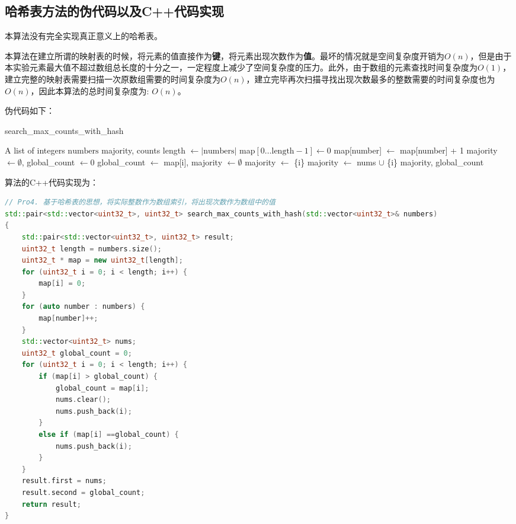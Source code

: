 \documentclass[UTF8,12pt,a4paper]{ctexart}
\begin{document}
\subsection{哈希表方法的伪代码以及C++代码实现}
本算法没有完全实现真正意义上的哈希表。

本算法在建立所谓的映射表的时候，将元素的值直接作为\textbf{键}，将元素出现次数作为\textbf{值}。最坏的情况就是空间复杂度开销为$O(n)$，但是由于本实验元素最大值不超过数组总长度的十分之一，一定程度上减少了空间复杂度的压力。此外，由于数组的元素查找时间复杂度为$O(1)$，建立完整的映射表需要扫描一次原数组需要的时间复杂度为$O(n)$，建立完毕再次扫描寻找出现次数最多的整数需要的时间复杂度也为$O(n)$，因此本算法的总时间复杂度为: $O(n)$。

伪代码如下：
\begin{algorithm}[H]
	\caption{search\_max\_counts\_with\_hash}
	\begin{algorithmic}[1]
	  \Require A list of integers $\text{numbers}$
	  \Ensure majority, counts
	  \State length $\gets |\text{numbers}|$
	  \State map$[0 \dots \text{length}-1] \gets 0$
		\State map[number] $\gets$ map[number] + 1
	  \EndFor
	  \State majority $\gets \emptyset$, global\_count $\gets 0$
		  \State global\_count $\gets$ map[i], majority $\gets \emptyset$
		  \State majority $\gets$ \{i\}
		  \State majority $\gets$ nums $\cup$ \{i\}
		\EndIf
	  \EndFor
	  \State \Return majority, global\_count
	\end{algorithmic}
\end{algorithm}

算法的C++代码实现为：
\begin{lstlisting}[language={C++}, basicstyle=\ttfamily\footnotesize]
// Pro4. 基于哈希表的思想，将实际整数作为数组索引，将出现次数作为数组中的值
std::pair<std::vector<uint32_t>, uint32_t> search_max_counts_with_hash(std::vector<uint32_t>& numbers)
{
    std::pair<std::vector<uint32_t>, uint32_t> result;
    uint32_t length = numbers.size();
    uint32_t * map = new uint32_t[length];
    for (uint32_t i = 0; i < length; i++) {
        map[i] = 0;
    }
    for (auto number : numbers) {
        map[number]++;
    }
    std::vector<uint32_t> nums;
    uint32_t global_count = 0;
    for (uint32_t i = 0; i < length; i++) {
        if (map[i] > global_count) {
            global_count = map[i];
            nums.clear();
            nums.push_back(i);
        }
        else if (map[i] ==global_count) {
            nums.push_back(i);
        }
    }
    result.first = nums;
    result.second = global_count;
    return result;
}
\end{lstlisting}
\newpage
\end{document}
